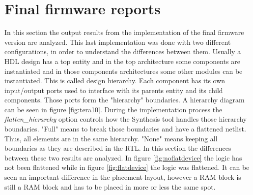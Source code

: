 \section{Final firmware reports}
In this section the output results from the implementation of the final firmware version are analyzed.
This last implementation was done with two different configurations, in order to understand the differences between them.
Usually a HDL design has a top entity and in the top architecture some components are instantiated and in those components architectures some other modules can be instantiated. This is called design hierarchy. Each component has its own input/output ports used to interface with its parents entity and its child components. Those ports form the "hierarchy" boundaries. A hierarchy diagram can be seen in figure \ref{fig:tera10}.
During the implementation process the \textit{flatten\_hierarchy} option controls how the Synthesis tool handles those hierarchy boundaries.
"Full" means to break those boundaries and have a flattened netlist. Thus, all elements are in the same hierarchy. "None" means keeping all boundaries as they are described in the RTL.
In this section the differences between these two results are analyzed. In figure \ref{fig:noflatdevice} the logic has not been flattened while in figure \ref{fig:flatdevice} the logic was flattened. It can be seen an important difference in the placement layout, however a RAM block is still a RAM block and has to be placed in more or less the same spot.

